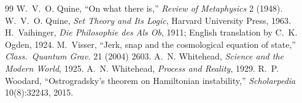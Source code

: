 \documentclass[11pt]{article}
\begin{document}
\begin{thebibliography}{99}
 W.~V.~O. Quine, ``On what there is,'' \emph{Review of Metaphysics} 2 (1948).
 W.~V.~O. Quine, \emph{Set Theory and Its Logic}, Harvard University Press, 1963.
 H.~Vaihinger, \emph{Die Philosophie des Als Ob}, 1911; English translation by C.~K. Ogden, 1924.
 M.~Visser, ``Jerk, snap and the cosmological equation of state,'' \emph{Class.\ Quantum Grav.} 21 (2004) 2603.
 A.~N. Whitehead, \emph{Science and the Modern World}, 1925.
 A.~N. Whitehead, \emph{Process and Reality}, 1929.
 R.~P. Woodard, ``Ostrogradsky's theorem on Hamiltonian instability,'' \emph{Scholarpedia} 10(8):32243, 2015.
\end{thebibliography}
\end{document}
